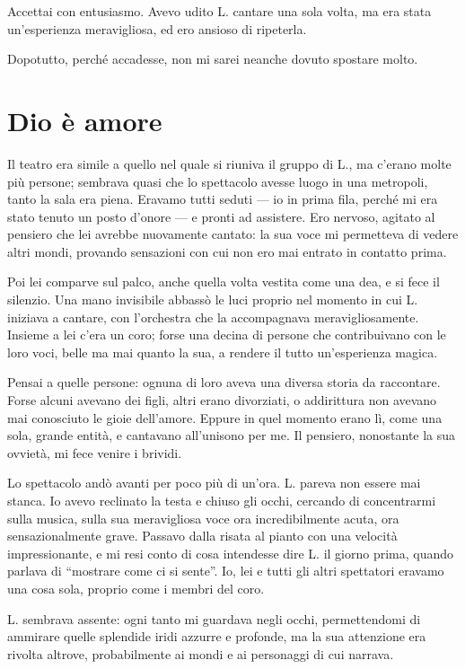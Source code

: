 \documentclass[a4paper,10pt]{memoir}
\begin{document}
Accettai con entusiasmo. Avevo udito L. cantare una sola volta, ma era stata un'esperienza meravigliosa, ed ero ansioso
di ripeterla.

Dopotutto, perché accadesse, non mi sarei neanche dovuto spostare molto.

\chapter{Dio è amore}

Il teatro era simile a quello nel quale si riuniva il gruppo di L., ma c'erano molte più persone; sembrava quasi che lo
spettacolo avesse luogo in una metropoli, tanto la sala era piena. Eravamo tutti seduti --- io in prima fila, perché mi
era stato tenuto un posto d'onore --- e pronti ad assistere. Ero nervoso, agitato al pensiero che lei avrebbe nuovamente
cantato: la sua voce mi permetteva di vedere altri mondi, provando sensazioni con cui non ero mai entrato in contatto
prima.

Poi lei comparve sul palco, anche quella volta vestita come una dea, e si fece il silenzio. Una mano invisibile abbassò
le luci proprio nel momento in cui L. iniziava a cantare, con l'orchestra che la accompagnava meravigliosamente. Insieme
a lei c'era un coro; forse una decina di persone che contribuivano con le loro voci, belle ma mai quanto la sua, a
rendere il tutto un'esperienza magica.

Pensai a quelle persone: ognuna di loro aveva una diversa storia da raccontare. Forse alcuni avevano dei figli, altri
erano divorziati, o addirittura non avevano mai conosciuto le gioie dell'amore. Eppure in quel momento erano lì, come
una sola, grande entità, e cantavano all'unisono per me. Il pensiero, nonostante la sua ovvietà, mi fece venire i
brividi.

Lo spettacolo andò avanti per poco più di un'ora. L. pareva non essere mai stanca. Io avevo reclinato la testa e chiuso
gli occhi, cercando di concentrarmi sulla musica, sulla sua meravigliosa voce ora incredibilmente acuta, ora
sensazionalmente grave. Passavo dalla risata al pianto con una velocità impressionante, e mi resi conto di cosa
intendesse dire L. il giorno prima, quando parlava di ``mostrare come ci si sente''. Io, lei e tutti gli altri
spettatori eravamo una cosa sola, proprio come i membri del coro.

L. sembrava assente: ogni tanto mi guardava negli occhi, permettendomi di ammirare quelle splendide iridi azzurre e
profonde, ma la sua attenzione era rivolta altrove, probabilmente ai mondi e ai personaggi di cui narrava.
\end{document}
